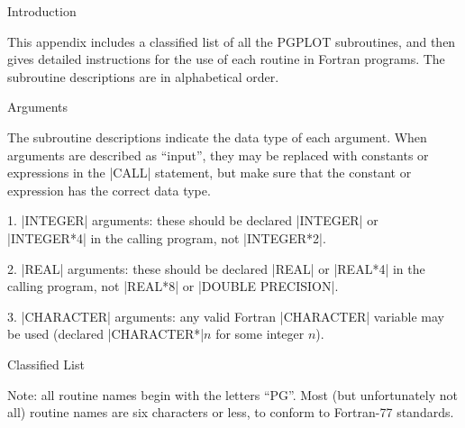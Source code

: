 

\beginsection Introduction

This appendix includes a classified list of all the PGPLOT subroutines,
and then gives detailed instructions for the use of each routine in
Fortran programs. The subroutine descriptions are in alphabetical order.

\beginsection Arguments

The subroutine descriptions indicate the data type of each argument. When
arguments are described as ``input'', they may be replaced with constants
or expressions in the |CALL| statement, but make sure that the constant
or expression has the correct data type. 

\item{1.} |INTEGER| arguments: these should be declared |INTEGER| or
|INTEGER*4| in the calling program, not |INTEGER*2|. 

\item{2.} |REAL| arguments: these should be declared |REAL| or |REAL*4|
in the calling program, not |REAL*8| or |DOUBLE PRECISION|. 

\item{3.} |CHARACTER| arguments: any valid Fortran |CHARACTER| variable
may be used (declared |CHARACTER*|$n$ for some integer $n$). 


\beginsection Classified List

Note: all routine names begin with the letters ``PG''. Most (but 
unfortunately not all) routine names are six characters or less, to 
conform to Fortran-77 standards.

